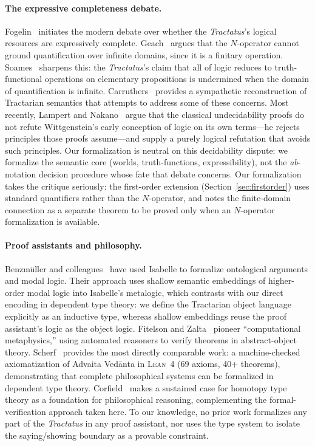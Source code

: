 \documentclass[10pt, letterpaper]{article}
\theoremstyle{definition}
\theoremstyle{remark}
\newcommand{\Lean}{\textsc{Lean}}
\begin{document}
\paragraph{The expressive completeness debate.}
Fogelin~\cite{fogelin1987} initiates the modern debate over
whether the \emph{Tractatus}'s logical resources are
expressively complete.  Geach~\cite{geach1981} argues that the
$N$-operator cannot ground quantification over infinite domains,
since it is a finitary operation.
Soames~\cite{soames1983} sharpens this: the \emph{Tractatus}'s
claim that all of logic reduces to truth-functional operations
on elementary propositions is undermined when the domain of
quantification is infinite.
Carruthers~\cite{carruthers1989} provides a sympathetic
reconstruction of Tractarian semantics that attempts to address
some of these concerns.
Most recently, Lampert and Nakano~\cite{lampert2025} argue that
the classical undecidability proofs do not refute Wittgenstein's
early conception of logic on its own terms---he rejects
principles those proofs assume---and supply a purely logical
refutation that avoids such principles.  Our formalization is
neutral on this decidability dispute: we formalize the semantic
core (worlds, truth-functions, expressibility), not the
\emph{ab}-notation decision procedure whose fate that debate
concerns.
Our formalization takes the critique seriously: the first-order
extension (Section~\ref{sec:firstorder}) uses standard
quantifiers rather than the $N$-operator, and notes the
finite-domain connection as a separate theorem to be proved only
when an $N$-operator formalization is available.

\paragraph{Proof assistants and philosophy.}
Benzm\"uller and colleagues~\cite{benzmuller2017} have used
Isabelle to formalize ontological arguments and modal logic.
Their approach uses shallow semantic embeddings of higher-order
modal logic into Isabelle's metalogic, which contrasts with our
direct encoding in dependent type theory: we define the
Tractarian object language explicitly as an inductive type,
whereas shallow embeddings reuse the proof assistant's logic
as the object logic.
Fitelson and Zalta~\cite{fitelson2007} pioneer ``computational
metaphysics,'' using automated reasoners to verify theorems
in abstract-object theory.
Scherf~\cite{scherf2025} provides the most directly comparable
work: a machine-checked axiomatization of Advaita Ved\=anta in
\Lean~4 (69 axioms, 40+ theorems), demonstrating that complete
philosophical systems can be formalized in dependent type
theory.
Corfield~\cite{corfield2020} makes a sustained case for
homotopy type theory as a foundation for philosophical
reasoning, complementing the formal-verification approach
taken here.
To our knowledge, no prior work formalizes any part of the
\emph{Tractatus} in any proof assistant, nor uses the type
system to isolate the saying/showing boundary as a provable
constraint.
\end{document}

